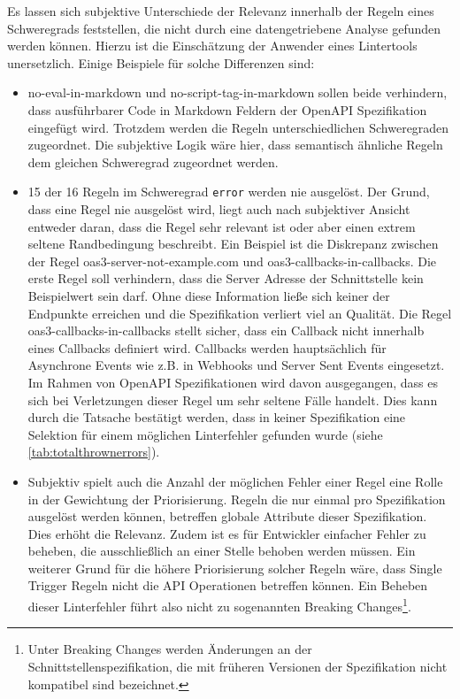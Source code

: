 Es lassen sich subjektive Unterschiede der Relevanz innerhalb der Regeln eines Schweregrads feststellen, die nicht durch eine datengetriebene Analyse gefunden werden können. Hierzu ist die Einschätzung der Anwender eines Lintertools unersetzlich. Einige Beispiele für solche Differenzen sind:
\begin{itemize}
  \item no-eval-in-markdown und no-script-tag-in-markdown sollen beide verhindern, dass ausführbarer Code in Markdown Feldern der OpenAPI Spezifikation eingefügt wird. Trotzdem werden die Regeln unterschiedlichen Schweregraden zugeordnet. Die subjektive Logik wäre hier, dass semantisch ähnliche Regeln dem gleichen Schweregrad zugeordnet werden.
  \item 15 der 16 Regeln im Schweregrad \texttt{error} werden nie ausgelöst. Der Grund, dass eine Regel nie ausgelöst wird, liegt auch nach subjektiver Ansicht entweder daran, dass die Regel sehr relevant ist oder aber einen extrem seltene Randbedingung beschreibt. Ein Beispiel ist die Diskrepanz zwischen der Regel oas3-server-not-example.com und oas3-callbacks-in-callbacks. Die erste Regel soll verhindern, dass die Server Adresse der Schnittstelle kein Beispielwert sein darf. Ohne diese Information ließe sich keiner der Endpunkte erreichen und die Spezifikation verliert viel an Qualität. Die Regel oas3-callbacks-in-callbacks stellt sicher, dass ein Callback nicht innerhalb eines Callbacks definiert wird. Callbacks werden hauptsächlich für Asynchrone Events wie z.B. in Webhooks und Server Sent Events eingesetzt. Im Rahmen von OpenAPI Spezifikationen wird davon ausgegangen, dass es sich bei Verletzungen dieser Regel um sehr seltene Fälle handelt. Dies kann durch die Tatsache bestätigt werden, dass in keiner Spezifikation eine Selektion für einem möglichen Linterfehler gefunden wurde (siehe \ref{tab:totalthrownerrors}).
  \item Subjektiv spielt auch die Anzahl der möglichen Fehler einer Regel eine Rolle in der Gewichtung der Priorisierung. Regeln die nur einmal pro Spezifikation ausgelöst werden können, betreffen globale Attribute dieser Spezifikation. Dies erhöht die Relevanz. Zudem ist es für Entwickler einfacher Fehler zu beheben, die ausschließlich an einer Stelle behoben werden müssen. Ein weiterer Grund für die höhere Priorisierung solcher Regeln wäre, dass Single Trigger Regeln nicht die API Operationen betreffen können. Ein Beheben dieser Linterfehler führt also nicht zu sogenannten Breaking Changes\footnote{Unter Breaking Changes werden Änderungen an der Schnittstellenspezifikation, die mit früheren Versionen der Spezifikation nicht kompatibel sind bezeichnet.}. 
\end{itemize}

